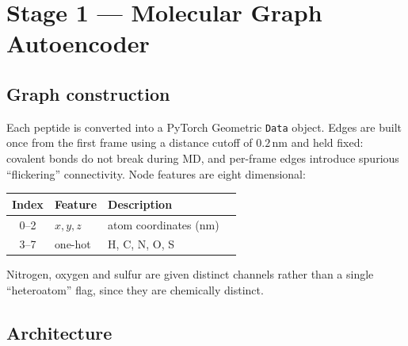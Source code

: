 \documentclass[11pt,a4paper]{article}
\begin{document}
\section{Stage 1 --- Molecular Graph Autoencoder}

\subsection{Graph construction}
Each peptide is converted into a PyTorch Geometric \texttt{Data} object. Edges
are built once from the first frame using a distance cutoff of $0.2$\,nm and
held fixed: covalent bonds do not break during MD, and per-frame edges
introduce spurious ``flickering'' connectivity. Node features are eight
dimensional:

\begin{center}
\begin{tabular}{@{}clll@{}}
\toprule
Index & Feature & Description \\
\midrule
0--2 & $x,y,z$ & atom coordinates (nm) \\
3--7 & one-hot & H, C, N, O, S \\
\bottomrule
\end{tabular}
\end{center}

Nitrogen, oxygen and sulfur are given distinct channels rather than a single
``heteroatom'' flag, since they are chemically distinct.

\subsection{Architecture}
\end{document}
